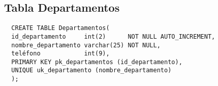 \subsection{Tabla Departamentos}

\begin{verbatim}
  CREATE TABLE Departamentos(
  id_departamento     int(2)      NOT NULL AUTO_INCREMENT,
  nombre_departamento varchar(25) NOT NULL,
  teléfono            int(9),
  PRIMARY KEY pk_departamentos (id_departamento),
  UNIQUE uk_departamento (nombre_departamento)
  );
\end{verbatim}